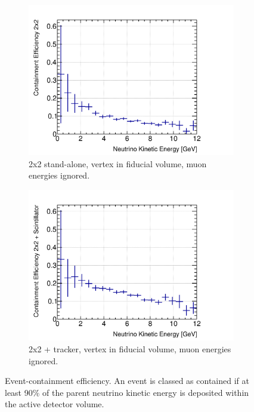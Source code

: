 \documentclass[10pt,a4paper,openany]{article}
\begin{document}
\begin{figure}[htbp]
	\centering
	\begin{subfigure}[b]{0.49\textwidth}
		\centering
    \includegraphics[width=1.0\textwidth]{E_cont_eff_2x2_fiducial_gap_no_muon.png}
		\caption{2x2 stand-alone, vertex in fiducial volume, muon energies ignored.}
		\label{}
	\end{subfigure}	
	\hfill
	\begin{subfigure}[b]{0.49\textwidth}
		\centering
		\includegraphics[width=1.0\textwidth]{E_cont_eff_2x2_Scintillator_fiducial_gap_no_muon.png}
		\caption{2x2 + tracker, vertex in fiducial volume, muon energies ignored.}
		\label{}
	\end{subfigure}	
  \caption{Event-containment efficiency. An event is classed as contained if at least 90\% of the parent neutrino kinetic energy is deposited within the active detector volume.}
\end{figure}
\end{document}
